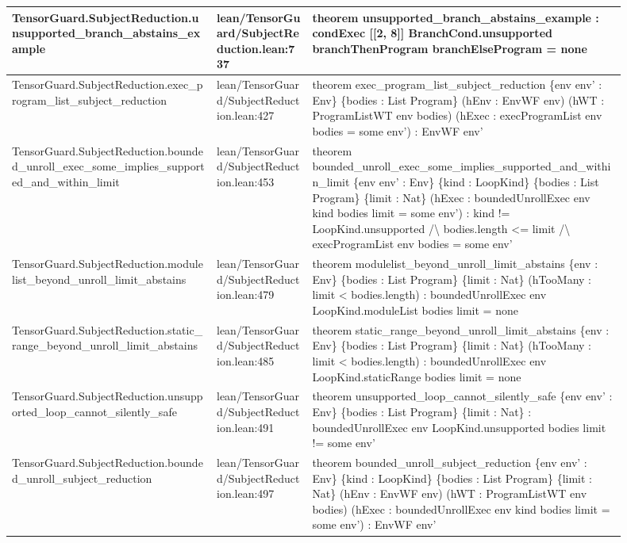 \documentclass[10pt]{article}
\begin{document}
\begin{longtable}{|p{0.30\linewidth}|p{0.14\linewidth}|p{0.46\linewidth}|}
\hline
TensorGuard.SubjectReduction.unsupported\_branch\_abstains\_example & lean/TensorGuard/SubjectReduction.lean:737 & theorem unsupported\_branch\_abstains\_example : condExec [[2, 8]] BranchCond.unsupported branchThenProgram branchElseProgram = none \\
\hline
TensorGuard.SubjectReduction.exec\_program\_list\_subject\_reduction & lean/TensorGuard/SubjectReduction.lean:427 & theorem exec\_program\_list\_subject\_reduction \{env env' : Env\} \{bodies : List Program\} (hEnv : EnvWF env) (hWT : ProgramListWT env bodies) (hExec : execProgramList env bodies = some env') : EnvWF env' \\
\hline
TensorGuard.SubjectReduction.bounded\_unroll\_exec\_some\_implies\_supported\_and\_within\_limit & lean/TensorGuard/SubjectReduction.lean:453 & theorem bounded\_unroll\_exec\_some\_implies\_supported\_and\_within\_limit \{env env' : Env\} \{kind : LoopKind\} \{bodies : List Program\} \{limit : Nat\} (hExec : boundedUnrollExec env kind bodies limit = some env') : kind != LoopKind.unsupported /\textbackslash{} bodies.length <= limit /\textbackslash{} execProgramList env bodies = some env' \\
\hline
TensorGuard.SubjectReduction.modulelist\_beyond\_unroll\_limit\_abstains & lean/TensorGuard/SubjectReduction.lean:479 & theorem modulelist\_beyond\_unroll\_limit\_abstains \{env : Env\} \{bodies : List Program\} \{limit : Nat\} (hTooMany : limit < bodies.length) : boundedUnrollExec env LoopKind.moduleList bodies limit = none \\
\hline
TensorGuard.SubjectReduction.static\_range\_beyond\_unroll\_limit\_abstains & lean/TensorGuard/SubjectReduction.lean:485 & theorem static\_range\_beyond\_unroll\_limit\_abstains \{env : Env\} \{bodies : List Program\} \{limit : Nat\} (hTooMany : limit < bodies.length) : boundedUnrollExec env LoopKind.staticRange bodies limit = none \\
\hline
TensorGuard.SubjectReduction.unsupported\_loop\_cannot\_silently\_safe & lean/TensorGuard/SubjectReduction.lean:491 & theorem unsupported\_loop\_cannot\_silently\_safe \{env env' : Env\} \{bodies : List Program\} \{limit : Nat\} : boundedUnrollExec env LoopKind.unsupported bodies limit != some env' \\
\hline
TensorGuard.SubjectReduction.bounded\_unroll\_subject\_reduction & lean/TensorGuard/SubjectReduction.lean:497 & theorem bounded\_unroll\_subject\_reduction \{env env' : Env\} \{kind : LoopKind\} \{bodies : List Program\} \{limit : Nat\} (hEnv : EnvWF env) (hWT : ProgramListWT env bodies) (hExec : boundedUnrollExec env kind bodies limit = some env') : EnvWF env' \\

\end{longtable}
\end{document}
